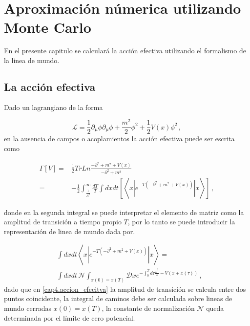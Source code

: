 \chapter{Aproximación númerica utilizando Monte Carlo}
{\label{cap.singular}}

En el presente capitulo se calculará la acción efectiva utilizando el formalismo de la linea de mundo.


\section{La acción efectiva}



Dado un lagrangiano de la forma


\begin{equation}
\mathscr{L} = \frac{1}{2} \partial _{\mu} \phi  \partial _{\mu} \phi +
	\frac{m^2}{2} \phi ^2  + \frac{1}{2} V(x) \phi ^2
	\, ,
\end{equation}
en la ausencia de campos o acoplamientos la acción efectiva puede ser escrita como


\begin{align}
\Gamma \left[ V \right] =&
  \frac{1}{2} Tr Ln \frac{- \partial ^2 + m ^2 + V(x)}{- \partial ^2 + m ^2} \\ 
 =& - \frac{1}{2} \int _{\frac{1}{\Lambda ^2}} ^{\infty} \frac{dT}{T} \int dx dt \left[ \left< x | e ^{-T (- \partial ^2 + m ^2 + V(x))} | x  \right> \right] \, ,
\label{cap4.accion_efecitva}
\end{align}


%

donde en la segunda integral se puede interpretar el elemento de matriz como la amplitud de transición a tiempo propio $T$, por lo tanto se puede introducir la representación de linea de mundo dada por.


\begin{align}
& \int dx  dt \left< x | e ^{-T (- \partial ^2 + m ^2 + V(x))} | x  \right> = \\
& \int dx  dt \, 
\mathcal{N}  \int _{x(0) = x(T)} \mathscr D x e ^{- \int _0 ^T d \tau  \frac{\dot{x} ^2}{4} - V(x + x( \tau )) }
\nonumber
\, ,
\label{eq.definicion_ensamble}
\end{align}
dado que en \eqref{cap4.accion_efecitva} la amplitud de transición se calcula entre dos puntos coincidente, la integral de caminos debe ser calculada sobre lineas de mundo cerradas $x(0) = x(T)$, la constante de normalización $\mathcal{N}$ queda determinada por el límite de cero potencial.


